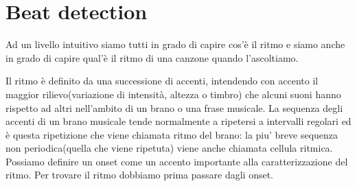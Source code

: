 \section{Beat detection}
\label{beatdetectionDescrizione}
Ad un livello intuitivo siamo tutti in grado di capire cos'\`e il ritmo e siamo anche in grado di capire qual'\`e il ritmo di una canzone quando l'ascoltiamo. 

Il ritmo \`e definito da una successione di accenti, intendendo con accento il maggior rilievo(variazione di intensit\`a, altezza o timbro) che alcuni suoni hanno rispetto ad altri nell'ambito di un brano o una frase musicale. La sequenza degli accenti di un brano musicale tende normalmente a ripetersi a intervalli regolari ed \`e questa ripetizione che viene chiamata ritmo del brano: la piu' breve sequenza non periodica(quella che viene ripetuta) viene anche chiamata cellula ritmica. Possiamo definire un onset come un accento importante alla caratterizzazione del ritmo. Per trovare il ritmo dobbiamo prima passare dagli onset.

% 






